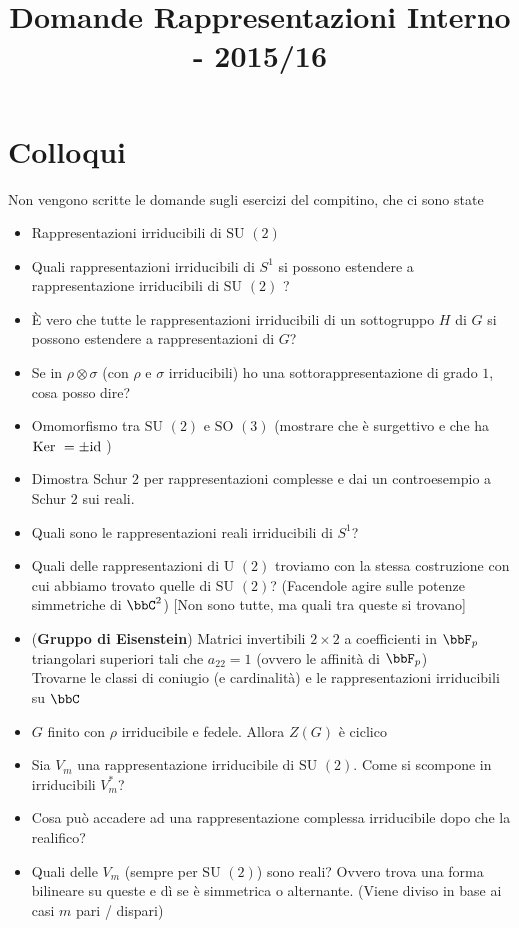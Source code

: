 \documentclass[a4paper,NoNotes,GeneralMath]{stdmdoc}
\newcommand{\SU}{\text{SU }}
\newcommand{\SO}{\text{SO }}
\newcommand{\U}{\text{U }}
\begin{document}
	\title{Domande Rappresentazioni Interno - 2015/16}

	\section*{Colloqui}
	Non vengono scritte le domande sugli esercizi del compitino, che ci sono state
	\begin{itemize}
		\item Rappresentazioni irriducibili di $\SU(2)$
		\item Quali rappresentazioni irriducibili di $S^1$ si possono estendere a rappresentazione irriducibili di $\SU(2)$ ?
		\item È vero che tutte le rappresentazioni irriducibili di un sottogruppo $H$ di $G$ si possono estendere a rappresentazioni di $G$?
		\item Se in $\rho \otimes \sigma$ (con $\rho$ e $\sigma$ irriducibili) ho una sottorappresentazione di grado $1$, cosa posso dire?
		\item Omomorfismo tra $\SU(2)$ e $\SO(3)$ (mostrare che è surgettivo e che ha $\mbox{Ker } = \pm \mbox{id}$ )
		\item Dimostra Schur $2$ per rappresentazioni complesse e dai un controesempio a Schur $2$ sui reali.
		\item Quali sono le rappresentazioni reali irriducibili di $S^1$?
		\item Quali delle rappresentazioni di $\U(2)$ troviamo con la stessa costruzione con cui abbiamo trovato quelle di $\SU(2)$? (Facendole agire sulle potenze simmetriche di $\bbC^2$) [Non sono tutte, ma quali tra queste si trovano]
		\item ({\bf Gruppo di Eisenstein}) Matrici invertibili $2\times 2$ a coefficienti in $\bbF_p$ triangolari superiori tali che $a_{22} = 1$ (ovvero le affinità di $\bbF_p$) \\
			Trovarne le classi di coniugio (e cardinalità) e le rappresentazioni irriducibili su $\bbC$
		\item $G$ finito con $\rho$ irriducibile e fedele. Allora $Z(G)$ è ciclico
		\item Sia $V_m$ una rappresentazione irriducibile di $\SU(2)$. Come si scompone in irriducibili $V_m^*$?
		\item Cosa può accadere ad una rappresentazione complessa irriducibile dopo che la realifico?
		\item Quali delle $V_m$ (sempre per $\SU(2)$) sono reali? Ovvero trova una forma bilineare su queste e dì se è simmetrica o alternante. (Viene diviso in base ai casi $m$ pari / dispari)

\end{itemize}
\end{document}
